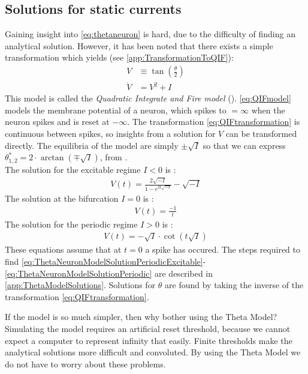 \subsection{Solutions for static currents} \label{sec:TheThetaNeuronModelSolutionPeriodics}
Gaining insight into \eqref{eq:thetaneuron} is hard, due to the difficulty of finding an analytical solution. However, it has been noted that there exists a simple transformation which yields (see \ref{app:TransformationToQIF}):
\begin{align}
V &\equiv \tan \left( \frac{\theta}{2} \right) \label{eq:QIFtransformation} \\
\dot{V} &= V^2 + I \label{eq:QIFmodel}
\end{align}
This model is called the \textsl{Quadratic Integrate and Fire model} (\QIF). \eqref{eq:QIFmodel} models the membrane potential of a neuron, which spikes to $=\infty$ when the neuron spikes and is reset at $-\infty$. The transformation \eqref{eq:QIFtransformation} is continuous between spikes, so insights from a solution for $V$ can be transformed directly. The equilibria of the \QIF model are simply $\pm \sqrt{I}$ so that we can express $\theta^{\ast}_{1, 2} = 2 \cdot\arctan \left( \mp \sqrt{I} \right)$, from \cite{Gutkin2014}. \\

The solution for the excitable regime $I < 0$ is :
\begin{align}
V(t) = \frac{2 \sqrt{-I}}{1 - e^{2 t \sqrt{-I}}}-\sqrt{-I} \label{eq:ThetaNeuronModelSolutionPeriodicExcitable}
\end{align}
The solution at the bifurcation $I = 0$ is :
\begin{align}
V(t) = \frac{-1}{t} \label{eq:ThetaNeuronModelSolutionPeriodicBifurcation}
\end{align}
The solution for the periodic regime $I > 0$ is :
\begin{align}
V(t) = -\sqrt{I} \cdot \cot (t \sqrt{I}) \label{eq:ThetaNeuronModelSolutionPeriodic}
\end{align}
These equations assume that at $t=0$ a spike has occured. The steps required to find \eqref{eq:ThetaNeuronModelSolutionPeriodicExcitable}-\eqref{eq:ThetaNeuronModelSolutionPeriodic} are described in \ref{app:ThetaModelSolutions}. Solutions for $\theta$ are found by taking the inverse of the transformation \eqref{eq:QIFtransformation}.

If the \QIF model is so much simpler, then why bother using the Theta Model? Simulating the \QIF model requires an artificial reset threshold, because we cannot expect a computer to represent infinity that easily. Finite thresholds make the analytical solutions more difficult and convoluted. By using the Theta Model we do not have to worry about these problems.\\

